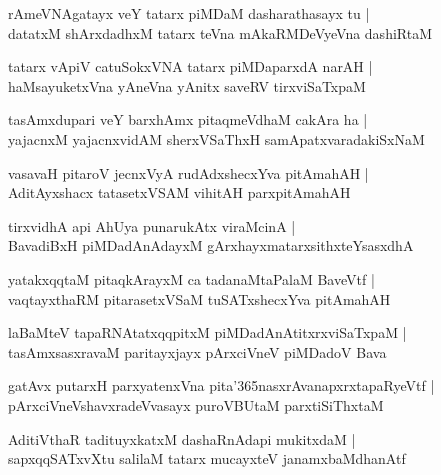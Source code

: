 \begin{shloka}
rAmeVNAgatayx veY tatarx piMDaM dasharathasayx tu |\\
datatxM shArxdadhxM tatarx teVna mAkaRMDeVyeVna dashiRtaM
\end{shloka}

\begin{shloka}
tatarx vApiV catuSokxVNA tatarx piMDaparxdA narAH |\\
haMsayuketxVna yAneVna yAnitx saveRV tirxviSaTxpaM
\end{shloka}

\begin{shloka}
tasAmxdupari veY barxhAmx pitaqmeVdhaM cakAra ha |\\
yajacnxM yajacnxvidAM sherxVSaThxH samApatxvaradakiSxNaM
\end{shloka}

\begin{shloka}
vasavaH pitaroV jecnxVyA rudAdxshecxYva pitAmahAH |\\
AditAyxshacx tatasetxVSAM vihitAH parxpitAmahAH
\end{shloka}

\begin{shloka}
tirxvidhA api AhUya punarukAtx viraMcinA |\\
BavadiBxH piMDadAnAdayxM gArxhayxmatarxsithxteYsasxdhA
\end{shloka}

\begin{shloka}
yatakxqqtaM pitaqkArayxM ca tadanaMtaPalaM BaveVtf |\\
vaqtayxthaRM pitarasetxVSaM tuSATxshecxYva pitAmahAH
\end{shloka}

\begin{shloka}
laBaMteV tapaRNAtatxqqpitxM piMDadAnAtitxrxviSaTxpaM |\\
tasAmxsasxravaM paritayxjayx pArxciVneV piMDadoV Bava
\end{shloka}

\begin{shloka}
gatAvx putarxH parxyatenxVna pita\char'365nasxrAvanapxrxtapaRyeVtf |\\
pArxciVneVshavxradeVvasayx puroVBUtaM parxtiSiThxtaM 
\end{shloka}

\begin{shloka}
AditiVthaR tadituyxkatxM dashaRnAdapi mukitxdaM |\\
sapxqqSATxvXtu salilaM tatarx mucayxteV janamxbaMdhanAtf
\end{shloka}

